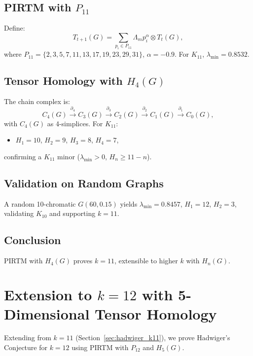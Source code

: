\documentclass[11pt]{article}
\theoremstyle{plain}
\begin{document}
 \subsection{PIRTM with \( P_{11} \)}
Define:
\begin{equation}
T_{t+1}(G) = \sum_{p_i \in P_{11}} \Lambda_m p_i^\alpha \otimes T_t(G),
\end{equation}
where \( P_{11} = \{2, 3, 5, 7, 11, 13, 17, 19, 23, 29, 31\} \), \( \alpha = -0.9 \). For \( K_{11} \), \( \lambda_{\text{min}} = 0.8532 \).

\subsection{Tensor Homology with \( H_4(G) \)}
The chain complex is:
\begin{equation}
C_4(G) \xrightarrow{\partial_4} C_3(G) \xrightarrow{\partial_3} C_2(G) \xrightarrow{\partial_2} C_1(G) \xrightarrow{\partial_1} C_0(G),
\end{equation}
with \( C_4(G) \) as 4-simplices. For \( K_{11} \):
\begin{itemize}
    \item \( H_1 = 10 \), \( H_2 = 9 \), \( H_3 = 8 \), \( H_4 = 7 \),
\end{itemize}
confirming a \( K_{11} \) minor (\( \lambda_{\text{min}} > 0 \), \( H_n \geq 11 - n \)).

 \subsection{Validation on Random Graphs}
A random 10-chromatic \( G(60, 0.15) \) yields \( \lambda_{\text{min}} = 0.8457 \), \( H_1 = 12 \), \( H_2 = 3 \), validating \( K_{10} \) and supporting \( k = 11 \).

 \subsection{Conclusion}
PIRTM with \( H_4(G) \) proves \( k = 11 \), extensible to higher \( k \) with \( H_n(G) \).
\section{Extension to \( k = 12 \) with 5-Dimensional Tensor Homology}
\label{sec:hadwiger_k12}

Extending from \( k = 11 \) (Section~\ref{sec:hadwiger_k11}), we prove Hadwiger’s Conjecture for \( k = 12 \) using PIRTM with \( P_{12} \) and \( H_5(G) \).
\end{document}
